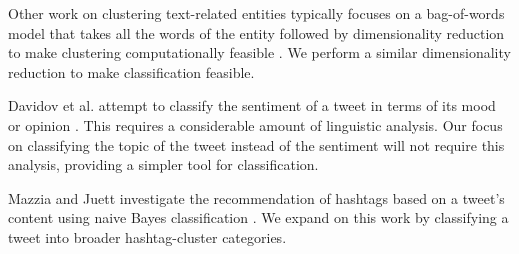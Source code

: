 Other work on clustering text-related entities typically focuses on a bag-of-words model that takes all the words of the entity followed by dimensionality reduction to make clustering computationally feasible \cite{Karandikar2010,Cheong2010}. We perform a similar dimensionality reduction to make classification feasible.

Davidov et al. attempt to classify the sentiment of a tweet in terms of its mood or opinion \cite{Davidov2010}. This requires a considerable amount of linguistic analysis. Our focus on classifying the topic of the tweet instead of the sentiment will not require this analysis, providing a simpler tool for classification.

Mazzia and Juett investigate the recommendation of hashtags based on a tweet's content using naive Bayes classification \cite{Mazzia2011}. We expand on this work by classifying a tweet into broader hashtag-cluster categories.